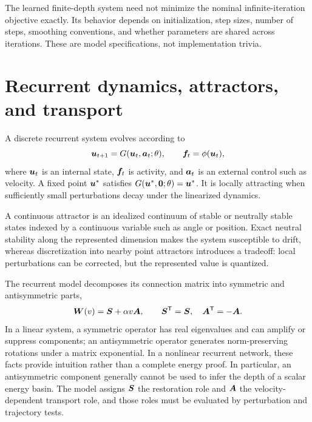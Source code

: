 The learned finite-depth system need not minimize the nominal infinite-iteration objective exactly. Its behavior depends on initialization, step sizes, number of steps, smoothing conventions, and whether parameters are shared across iterations. These are model specifications, not implementation trivia.

\section{Recurrent dynamics, attractors, and transport}
\label{sec:framework-recurrent}

A discrete recurrent system evolves according to
\begin{equation}
\label{eq:rnn-general}
\bm{u}_{t+1}=G(\bm{u}_t,\bm{a}_t;\theta),
\qquad
\bm{f}_t=\phi(\bm{u}_t),
\end{equation}
where $\bm{u}_t$ is an internal state, $\bm{f}_t$ is activity, and $\bm{a}_t$ is an external control such as velocity. A fixed point $\bm{u}^*$ satisfies $G(\bm{u}^*,\bm{0};\theta)=\bm{u}^*$. It is locally attracting when sufficiently small perturbations decay under the linearized dynamics.

A continuous attractor is an idealized continuum of stable or neutrally stable states indexed by a continuous variable such as angle or position. Exact neutral stability along the represented dimension makes the system susceptible to drift, whereas discretization into nearby point attractors introduces a tradeoff: local perturbations can be corrected, but the represented value is quantized.

The recurrent model decomposes its connection matrix into symmetric and antisymmetric parts,
\begin{equation}
\label{eq:symmetric-antisymmetric}
\bm{W}(v)=\bm{S}+\alpha v\bm{A},
\qquad
\bm{S}^{\mathsf{T}}=\bm{S},
\quad
\bm{A}^{\mathsf{T}}=-\bm{A}.
\end{equation}
In a linear system, a symmetric operator has real eigenvalues and can amplify or suppress components; an antisymmetric operator generates norm-preserving rotations under a matrix exponential. In a nonlinear recurrent network, these facts provide intuition rather than a complete energy proof. In particular, an antisymmetric component generally cannot be used to infer the depth of a scalar energy basin. The model assigns $\bm{S}$ the restoration role and $\bm{A}$ the velocity-dependent transport role, and those roles must be evaluated by perturbation and trajectory tests.

